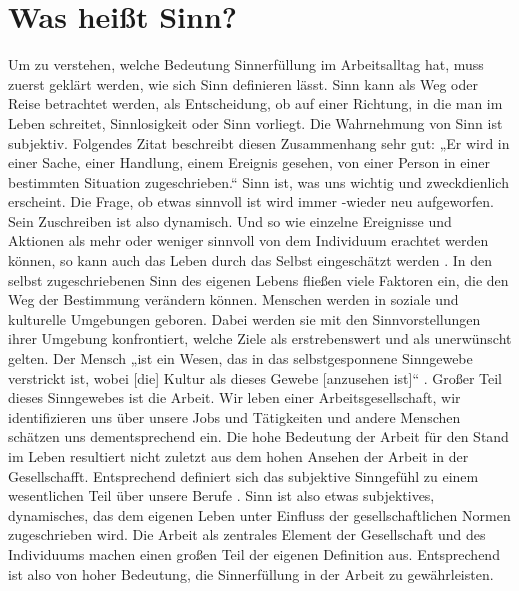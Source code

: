 \chapter{Was heißt Sinn?}
Um zu verstehen, welche Bedeutung Sinnerfüllung im Arbeitsalltag hat, muss zuerst geklärt werden, wie sich Sinn definieren lässt. Sinn kann als Weg oder Reise betrachtet werden, als Entscheidung, ob auf einer Richtung, in die man im Leben schreitet, Sinnlosigkeit oder Sinn vorliegt. Die Wahrnehmung von Sinn ist subjektiv. Folgendes Zitat beschreibt diesen Zusammenhang sehr gut:
„Er wird in einer Sache, einer Handlung, einem Ereignis gesehen, von einer Person in einer bestimmten Situation zugeschrieben.“
Sinn ist, was uns wichtig und zweckdienlich erscheint. Die Frage, ob etwas sinnvoll ist wird immer -wieder neu aufgeworfen.\cite[S.47-48]{Ehresmann.2018} Sein Zuschreiben ist also dynamisch. Und so wie einzelne Ereignisse und Aktionen als mehr oder weniger sinnvoll von dem Individuum erachtet werden können, so kann auch das Leben durch das Selbst eingeschätzt werden \cite[S.12]{Schnell.2018}.
In den selbst zugeschriebenen Sinn des eigenen Lebens fließen viele Faktoren ein, die den Weg der Bestimmung verändern können. Menschen werden in soziale und kulturelle Umgebungen geboren. Dabei werden sie mit den Sinnvorstellungen ihrer Umgebung konfrontiert, welche Ziele als erstrebenswert und als unerwünscht gelten. Der Mensch „ist ein Wesen, das in das selbstgesponnene Sinngewebe verstrickt ist, wobei [die] Kultur als dieses Gewebe [anzusehen ist]“ \cite[S.47-48]{Ehresmann.2018}. Großer Teil dieses Sinngewebes ist die Arbeit. Wir leben einer Arbeitsgesellschaft, wir identifizieren uns über unsere Jobs und Tätigkeiten und andere Menschen schätzen uns dementsprechend ein. Die hohe Bedeutung der Arbeit für den Stand im Leben resultiert nicht zuletzt aus dem hohen Ansehen der Arbeit in der Gesellschafft. Entsprechend definiert sich das subjektive Sinngefühl zu einem wesentlichen Teil über unsere Berufe \cite[S.47-48]{Ehresmann.2018}.
Sinn ist also etwas subjektives, dynamisches, das dem eigenen Leben unter Einfluss der gesellschaftlichen Normen zugeschrieben wird. Die Arbeit als zentrales Element der Gesellschaft und des Individuums machen einen großen Teil der eigenen Definition aus. Entsprechend ist also von hoher Bedeutung, die Sinnerfüllung in der Arbeit zu gewährleisten. 
